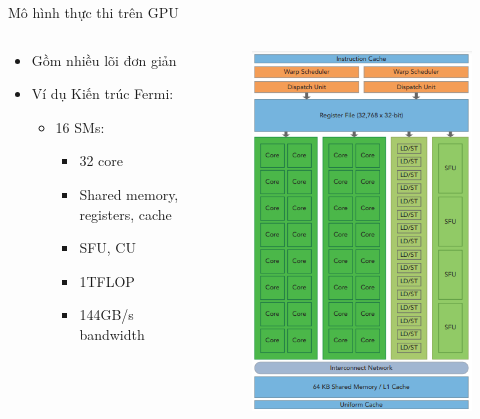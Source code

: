 \documentclass[10pt]{beamer}
\theoremstyle{remark}
\numberwithin{algocf}{section}
\numberwithin{equation}{section}
\numberwithin{dl}{section}
\numberwithin{figure}{section}
\begin{document}
\begin{frame}{Mô hình thực thi trên GPU}
    \begin{columns}[onlytextwidth]
        \begin{column}{0.5\linewidth}
            \begin{itemize}
                \item Gồm nhiều lõi đơn giản
                \item Ví dụ Kiến trúc Fermi:
                \begin{itemize}
                    \item 16 SMs:
                    \begin{itemize}
                        \item 32 core 
                        \item Shared memory, registers, cache 
                        \item SFU, CU
                        \item 1TFLOP 
                        \item 144GB/s bandwidth
                    \end{itemize}
                \end{itemize}
            \end{itemize}
        \end{column}
        \begin{column}{0.5\linewidth}
            \begin{figure}[H]
                \centering
                \includegraphics[width=0.75\linewidth]{figures/CUDA/SMs_diagram.png}

\end{figure}
\end{column}
\end{columns}
\end{frame}
\end{document}
